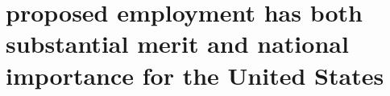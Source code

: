 













\section{\mrls{} proposed employment has both substantial merit and national importance for the United States}

